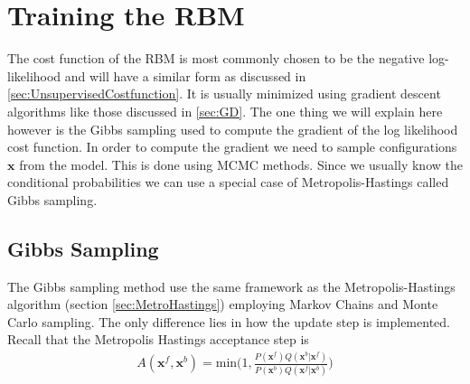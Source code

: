 \documentclass[twoside,english]{uiofysmaster}
\begin{document}
\begin{comment}
\subsubsection{Further analysis of the GB-RBM - the marginal prob as a MoG}

\subsection{Gaussian-something continuous RBM?}
If we use Gaussian latent variables and Gaussian visible variables, we get an undirected version of factor analysis. However, it turns out that it is identical to the standard directed version (Marks and Movellan 2001).
If we use Gaussian latent variables and categorical observed variables, we get an undirected version of categorical PCA (Section 27.2.2). In (Salakhutdinov et al. 2007), this was applied to the Netflix collaborative filtering problem, but was found to be significantly inferior to using binary latent variables, which have more expressive power. \cite{Murphy2012}
\end{comment}




\section{Training the RBM}

The cost function of the RBM is most commonly chosen to be the negative log-likelihood and will have a similar form as discussed in \ref{sec:UnsupervisedCostfunction}. It is usually minimized using gradient descent algorithms like those discussed in \ref{sec:GD}. The one thing we will explain here however is the Gibbs sampling used to compute the gradient of the log likelihood cost function. In order to compute the gradient we need to sample configurations $\bm{x}$ from the model. This is done using MCMC methods. Since we usually know the conditional probabilities we can use a special case of Metropolis-Hastings called Gibbs sampling.

\subsection{Gibbs Sampling}
The Gibbs sampling method use the same framework as the Metropolis-Hastings algorithm (section \ref{sec:MetroHastings}) employing Markov Chains and Monte Carlo sampling. The only difference lies in how the update step is implemented. 
Recall that the Metropolis Hastings acceptance step is
\begin{align}
	A(\bm{x}^f, \bm{x}^b) = \text{min} \Big(1,  \frac{  P(\bm{x}^f) Q(\bm{x}^b| \bm{x}^f) }
	{  P(\bm{x}^b) Q(\bm{x}^f| \bm{x}^b)  }  \Big)
\end{align}
\end{document}
